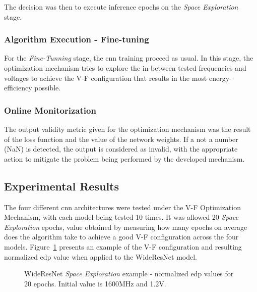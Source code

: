 The decision was then to execute inference epochs on the \textit{Space Exploration} stage.


\subsubsection{Algorithm Execution - Fine-tuning}

For the \textit{Fine-Tunning} stage, the \acrshort{cnn} training proceed as usual. In this stage, the optimization mechanism tries to explore the in-between tested frequencies and voltages to achieve the V-F configuration that results in the most energy-efficiency possible.  

\subsubsection{Online Monitorization}

The output validity metric given for the optimization mechanism was the result of the loss function and the value of the network weights. If a not a number (NaN) is detected, the output is considered as invalid, with the appropriate action to mitigate the problem being performed by the developed mechanism.



\subsection{Experimental Results}

The four different \acrshort{cnn} architectures were tested under the V-F Optimization Mechanism, with each model being tested 10 times. It was allowed 20 \textit{Space Exploration} epochs, value obtained by measuring how many epochs on average does the algorithm take to achieve a good V-F configuration across the four models. Figure~\ref{fig:3d} presents an example of the V-F configuration and resulting normalized \acrshort{edp} value when applied to the WideResNet model.

\begin{figure}[h]
\centering
    \caption{WideResNet \textit{Space Exploration} example - normalized \acrshort{edp} values for 20 epochs. Initial value is 1600MHz and 1.2V.}
    \label{fig:3d}
\end{figure}



